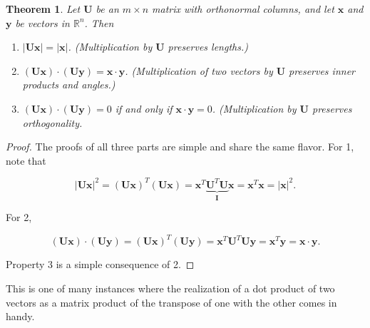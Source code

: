 \documentclass[
]{book}
\newtheorem{theorem}{Theorem}[chapter]
\theoremstyle{definition}
\theoremstyle{definition}
\theoremstyle{definition}
\theoremstyle{definition}
\theoremstyle{remark}
\begin{document}
\begin{theorembox}

\begin{theorem}

Let \(\mathbf{U}\) be an \(m\times n\) matrix with orthonormal columns, and let \(\mathbf{x}\) and \(\mathbf{y}\) be vectors in \(\mathbb{R}^n\). Then

\begin{enumerate}
\def\labelenumi{\arabic{enumi}.}
\item
  \(|\mathbf{U}\mathbf{x}|=|\mathbf{x}|\). (Multiplication by \(\mathbf{U}\) preserves lengths.)
\item
  \((\mathbf{U}\mathbf{x})\cdot(\mathbf{U}\mathbf{y})=\mathbf{x}\cdot\mathbf{y}\). (Multiplication of two vectors by \(\mathbf{U}\) preserves inner products and angles.)
\item
  \((\mathbf{U}\mathbf{x})\cdot(\mathbf{U}\mathbf{y})=0\) if and only if \(\mathbf{x}\cdot\mathbf{y}=0\). (Multiplication by \(\mathbf{U}\) preserves orthogonality.
\end{enumerate}

\end{theorem}

\end{theorembox}

\begin{proof}
The proofs of all three parts are simple and share the same flavor. For 1, note that

\[|\mathbf{U}\mathbf{x}|^2=(\mathbf{U}\mathbf{x})^T(\mathbf{U}\mathbf{x})=\mathbf{x}^T\underbrace{\mathbf{U}^T\mathbf{U}}_{\mathbf{I}}\mathbf{x}=\mathbf{x}^T\mathbf{x}=|\mathbf{x}|^2.\]

For 2,

\[(\mathbf{U}\mathbf{x})\cdot(\mathbf{U}\mathbf{y})=(\mathbf{U}\mathbf{x})^T(\mathbf{U}\mathbf{y})=\mathbf{x}^T\mathbf{U}^T\mathbf{U}\mathbf{y}=\mathbf{x}^T\mathbf{y}=\mathbf{x}\cdot\mathbf{y}.\]

Property 3 is a simple consequence of 2.
\end{proof}

This is one of many instances where the realization of a dot product of two vectors as a matrix product of the transpose of one with the other comes in handy.
\end{document}
